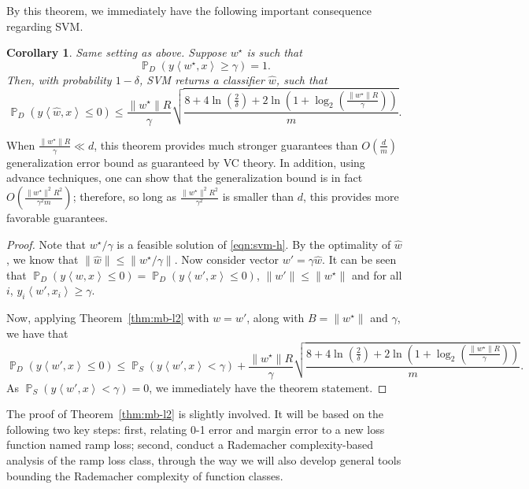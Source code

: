 \documentclass{article}
\newtheorem{corollary}{Corollary}
\DeclareMathOperator*{\PP}{{\mathbb P}}
\newcommand{\inner}[2]{\left\langle #1,#2 \right\rangle}
\begin{document}
By this theorem, we immediately have the following
important consequence regarding SVM.
\begin{corollary}
Same setting as above. Suppose $w^\star$ is such that %
\[ \PP_{D}(y \inner{w^\star}{x} \geq \gamma) = 1. \]
Then, with probability $1-\delta$, SVM returns a classifier $\hat{w}$, such that
\[ \PP_D( y \inner{\hat{w}}{x} \leq 0 )
   \leq
   \frac{\|w^\star\|R}{\gamma} \sqrt{\frac{8 + 4\ln(\frac{2}{\delta}) + 2\ln(1+\log_2(\frac{\|w^\star\|R}{\gamma}))}{m}}.
 \]
\end{corollary}
When $\frac{\|w^\star\|R}{\gamma} \ll d$, this theorem provides much stronger guarantees than $O(\frac{d}{m})$ generalization error bound as guaranteed by VC theory.
In addition, using advance techniques, one can show that the generalization bound is in fact $O(\frac{\|w^\star\|^2R^2}{\gamma^2 m})$; therefore, so long as $\frac{\|w^\star\|^2R^2}{\gamma^2}$ is smaller than $d$, this provides more favorable guarantees.

\begin{proof}
Note that $w^\star / \gamma$ is a feasible solution of \ref{eqn:svm-h}. By the optimality of $\hat{w}$, we know that $\| \hat{w} \| \leq \| w^\star / \gamma \|$. Now consider vector $w' = \gamma \hat{w}$.
It can be seen that $\PP_D( y \inner{w}{x} \leq 0 ) = \PP_D( y \inner{w'}{x} \leq 0 )$, $\| w' \| \leq \| w^\star \|$ and for all $i$, $y_i \inner{w'}{x_i} \geq \gamma$.

Now, applying Theorem~\ref{thm:mb-l2} with $w = w'$, along with
$B = \| w^\star \|$ and $\gamma$, we have that
\[ \PP_D( y \inner{w'}{x} \leq 0 )
\leq \PP_S (y \inner{w'}{x} < \gamma) + \frac{\|w^\star\|R}{\gamma} \sqrt{\frac{8 + 4\ln(\frac{2}{\delta}) + 2\ln(1+\log_2(\frac{\|w^\star\|R}{\gamma}))}{m}}. \]
As $\PP_S (y \inner{w'}{x} < \gamma) = 0$, we immediately have the theorem statement.
\end{proof}

The proof of Theorem~\ref{thm:mb-l2} is slightly involved. It will be based on the following two key steps: first, relating 0-1 error and margin error to a new loss function named ramp loss; second, conduct a Rademacher complexity-based analysis of the ramp loss class, through the way we will also develop general tools bounding the Rademacher complexity of function classes.
\end{document}
